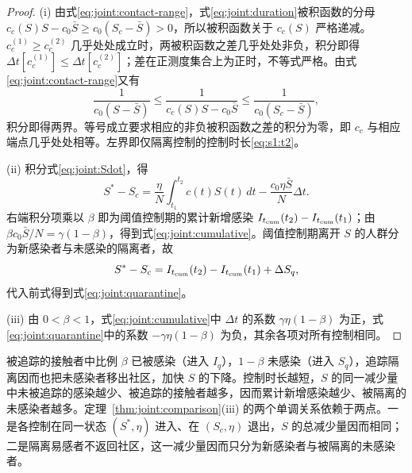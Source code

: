 \begin{proof}
(i) 由式\eqref{eq:joint:contact-range}，式\eqref{eq:joint:duration}被积函数的分母 $c_c(S)S-c_0\bar S\ge c_0(S_c-\bar S)>0$，所以被积函数关于 $c_c(S)$ 严格递减。$c_c^{(1)}\ge c_c^{(2)}$ 几乎处处成立时，两被积函数之差几乎处处非负，积分即得 $\Delta t[c_c^{(1)}]\le\Delta t[c_c^{(2)}]$；差在正测度集合上为正时，不等式严格。由式\eqref{eq:joint:contact-range}又有
\[
\frac1{c_0(S-\bar S)}\le
\frac1{c_c(S)S-c_0\bar S}\le
\frac1{c_0(S_c-\bar S)},
\]
积分即得两界。等号成立要求相应的非负被积函数之差的积分为零，即 $c_c$ 与相应端点几乎处处相等。左界即仅隔离控制的控制时长\eqref{eq:s1:t2}。

(ii) 积分式\eqref{eq:joint:Sdot}，得
\[
S^*-S_c=\frac{\eta}{N}\int_{t_1}^{t_2}c(t)S(t)\,dt
-\frac{c_0\eta\bar S}{N}\Delta t.
\]
右端积分项乘以 $\beta$ 即为阈值控制期的累计新增感染 $I_{t_{\mathrm{cum}}}(t_2)-I_{t_{\mathrm{cum}}}(t_1)$；由 $\beta c_0\bar S/N=\gamma(1-\beta)$，得到式\eqref{eq:joint:cumulative}。阈值控制期离开 $S$ 的人群分为新感染者与未感染的隔离者，故
\[
S^*-S_c=I_{t_{\mathrm{cum}}}(t_2)-I_{t_{\mathrm{cum}}}(t_1)+\Delta S_q,
\]
代入前式得到式\eqref{eq:joint:quarantine}。

(iii) 由 $0<\beta<1$，式\eqref{eq:joint:cumulative}中 $\Delta t$ 的系数 $\gamma\eta(1-\beta)$ 为正，式\eqref{eq:joint:quarantine}中的系数 $-\gamma\eta(1-\beta)$ 为负，其余各项对所有控制相同。
\end{proof}
被追踪的接触者中比例 $\beta$ 已被感染（进入 $I_q$），$1-\beta$ 未感染（进入 $S_q$），追踪隔离因而也把未感染者移出社区，加快 $S$ 的下降。控制时长越短，$S$ 的同一减少量中未被追踪的感染越少、被追踪的接触者越多，因而累计新增感染越少、被隔离的未感染者越多。定理~\ref{thm:joint:comparison}(iii) 的两个单调关系依赖于两点。一是各控制在同一状态 $(S^*,\eta)$ 进入、在 $(S_c,\eta)$ 退出，$S$ 的总减少量因而相同；二是隔离易感者不返回社区，这一减少量因而只分为新感染者与被隔离的未感染者。

